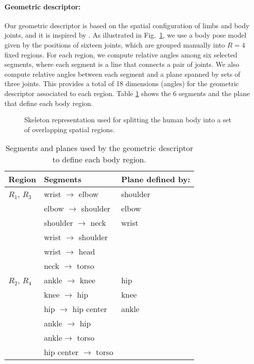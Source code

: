 
\paragraph{\textbf{Geometric descriptor:}}
Our geometric descriptor is based on the spatial configuration of limbs and body joints, and it is 
inspired by \cite{Chen2010a}.
As illustrated in Fig.~\ref{fig:skeleton_limbs_regions}, we use a body pose model given by the positions of sixteen joints,
which are grouped manually into $R = 4$ fixed regions.
For each region, we compute relative angles among six selected segments, where each segment is a 
line
that connects a pair of joints. We also compute relative angles between each
segment and a plane spanned by sets of three joints. This provides a
total of 18 dimensions (angles) for the geometric descriptor associated to each region.
Table \ref{tab:geometric_relations_for_regions} shows the 6 segments and the plane that define 
each body region. 

%
\begin{figure}[tb]
\begin{center}
\fbox{\rule{0pt}{2in} \rule{0.9\linewidth}{0pt}}
\end{center}
   \caption{Skeleton representation used for splitting the human body into a set of 
overlapping spatial regions.}
\label{fig:skeleton_limbs_regions}
\end{figure}
%
\begin{table}
\center
\begin{tabular}{|l|l|l| }
\hline
Region & Segments & Plane defined by: \\
\hline \hline
$R_1$, $R_3$ & wrist $\rightarrow$ elbow & shoulder \\
& elbow $\rightarrow$ shoulder & elbow \\
& shoulder $\rightarrow$ neck & wrist \\
& wrist $\rightarrow$ shoulder & \\
& wrist $\rightarrow$ head & \\
& neck $\rightarrow$ torso & \\
\hline
$R_2$, $R_4$ & ankle $\rightarrow$ knee &  hip \\
& knee $\rightarrow$ hip & knee \\
& hip $\rightarrow$ hip center & ankle \\
& ankle $\rightarrow$ hip & \\
& ankle$\rightarrow$ torso & \\
& hip center $\rightarrow$ torso & \\
\hline
\end{tabular}
\caption{Segments and planes used by the geometric descriptor to define each body 
region.}
\label{tab:geometric_relations_for_regions}
\end{table}

